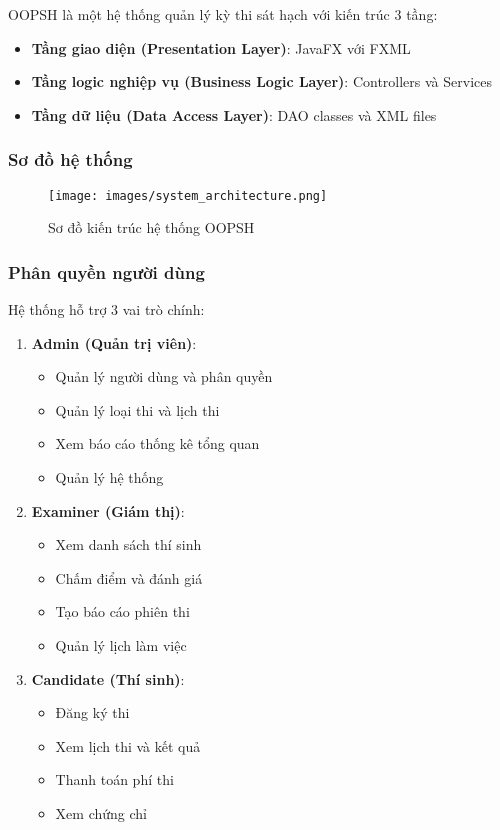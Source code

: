 \documentclass[12pt,a4paper]{article}
\begin{document}
OOPSH là một hệ thống quản lý kỳ thi sát hạch với kiến trúc 3 tầng:
\begin{itemize}
    \item \textbf{Tầng giao diện (Presentation Layer)}: JavaFX với FXML
    \item \textbf{Tầng logic nghiệp vụ (Business Logic Layer)}: Controllers và Services
    \item \textbf{Tầng dữ liệu (Data Access Layer)}: DAO classes và XML files
\end{itemize}

\subsubsection{Sơ đồ hệ thống}

\begin{figure}[H]
\centering
\texttt{[image: images/system\_architecture.png]}
\caption{Sơ đồ kiến trúc hệ thống OOPSH}
\label{fig:system_architecture}
\end{figure}

\subsubsection{Phân quyền người dùng}

Hệ thống hỗ trợ 3 vai trò chính:

\begin{enumerate}
    \item \textbf{Admin (Quản trị viên)}:
    \begin{itemize}
        \item Quản lý người dùng và phân quyền
        \item Quản lý loại thi và lịch thi
        \item Xem báo cáo thống kê tổng quan
        \item Quản lý hệ thống
    \end{itemize}
    
    \item \textbf{Examiner (Giám thị)}:
    \begin{itemize}
        \item Xem danh sách thí sinh
        \item Chấm điểm và đánh giá
        \item Tạo báo cáo phiên thi
        \item Quản lý lịch làm việc
    \end{itemize}
    
    \item \textbf{Candidate (Thí sinh)}:
    \begin{itemize}
        \item Đăng ký thi
        \item Xem lịch thi và kết quả
        \item Thanh toán phí thi
        \item Xem chứng chỉ
    \end{itemize}
\end{enumerate}
\end{document}
